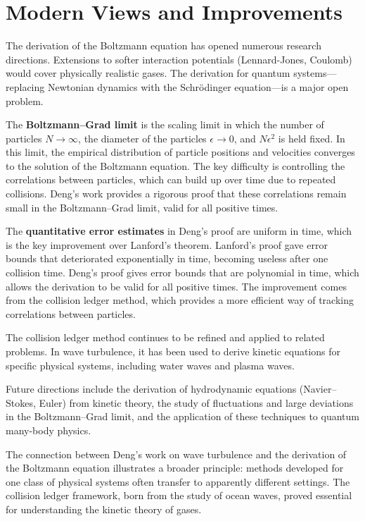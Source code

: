 \section{Modern Views and Improvements}

The derivation of the Boltzmann equation has opened numerous research directions. Extensions to softer interaction potentials (Lennard-Jones, Coulomb) would cover physically realistic gases. The derivation for quantum systems---replacing Newtonian dynamics with the Schr\"{o}dinger equation---is a major open problem.

The \textbf{Boltzmann--Grad limit} is the scaling limit in which the number of particles $N \to \infty$, the diameter of the particles $\epsilon \to 0$, and $N\epsilon^2$ is held fixed. In this limit, the empirical distribution of particle positions and velocities converges to the solution of the Boltzmann equation. The key difficulty is controlling the correlations between particles, which can build up over time due to repeated collisions. Deng's work provides a rigorous proof that these correlations remain small in the Boltzmann--Grad limit, valid for all positive times.

The \textbf{quantitative error estimates} in Deng's proof are uniform in time, which is the key improvement over Lanford's theorem. Lanford's proof gave error bounds that deteriorated exponentially in time, becoming useless after one collision time. Deng's proof gives error bounds that are polynomial in time, which allows the derivation to be valid for all positive times. The improvement comes from the collision ledger method, which provides a more efficient way of tracking correlations between particles.

The collision ledger method continues to be refined and applied to related problems. In wave turbulence, it has been used to derive kinetic equations for specific physical systems, including water waves and plasma waves.

Future directions include the derivation of hydrodynamic equations (Navier--Stokes, Euler) from kinetic theory, the study of fluctuations and large deviations in the Boltzmann--Grad limit, and the application of these techniques to quantum many-body physics.

The connection between Deng's work on wave turbulence and the derivation of the Boltzmann equation illustrates a broader principle: methods developed for one class of physical systems often transfer to apparently different settings. The collision ledger framework, born from the study of ocean waves, proved essential for understanding the kinetic theory of gases.

